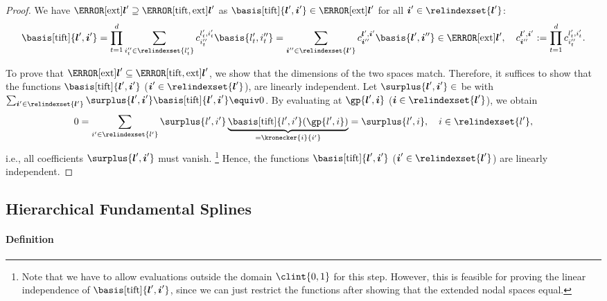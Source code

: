 \begin{proof}
  We have $\ns[\ext]{\*l'} \supset \ns[\tift,\ext]{\*l'}$ as
  $\basis[\tift]{\*l',\*i'} \in \ns[\ext]{\*l'}$
  for all $\*i' \in \relindexset{\*l'}$:
  \begin{equation}
    \basis[\tift]{\*l',\*i'}
    = \prod_{t=1}^d \sum_{i''_t \in \relindexset{l'_t}}
    c_{i''_t}^{l'_t,i'_t} \basis{l'_t,i''_t}
    = \sum_{\*i'' \in \relindexset{\*l'}}
    c_{\*i''}^{\*l',\*i'} \basis{\*l',\*i''}
    \in \ns[\ext]{\*l'},\quad
    c_{\*i''}^{\*l',\*i'}
    := \prod_{t=1}^d c_{i''_t}^{l'_t,i'_t}.
  \end{equation}
  
  To prove that
  $\ns[\ext]{\*l'} \subset \ns[\tift,\ext]{\*l'}$,
  we show that the dimensions of the two spaces match.
  Therefore, it suffices to show that
  the functions $\basis[\tift]{\*l',\*i'}$ ($\*i' \in \relindexset{\*l'}$),
  are linearly independent.
  Let $\surplus{\*l',\*i'} \in \real$ be with
  $\sum_{\*i' \in \relindexset{\*l'}}
  \surplus{\*l',\*i'} \basis[\tift]{\*l',\*i'} \equiv 0$.
  By evaluating at $\gp{\*l',\*i}$ ($\*i \in \relindexset{\*l'}$), we obtain
  \begin{equation}
    0
    = \sum_{\*i' \in \relindexset{\*l'}} \surplus{\*l',\*i'}
    \underbrace{\basis[\tift]{\*l',\*i'}(\gp{\*l',\*i})}_{=\kronecker{\*i}{\*i'}}
    = \surplus{\*l',\*i},\quad
    \*i \in \relindexset{\*l'},
  \end{equation}
  i.e., all coefficients $\surplus{\*l',\*i'}$ must vanish.%
  \footnote{%
    Note that we have to allow evaluations outside the
    domain $\clint{0, 1}$ for this step.
    However, this is feasible for proving the linear independence
    of $\basis[\tift]{\*l',\*i'}$, since we can just restrict the functions
    after showing that the extended nodal spaces equal.%
  }
  Hence, the functions $\basis[\tift]{\*l',\*i'}$ ($\*i' \in \relindexset{\*l'}$)
  are linearly independent.
\end{proof}



\subsection{Hierarchical Fundamental Splines}
\label{sec:443fundamentalSplines}

\paragraph{Definition}

